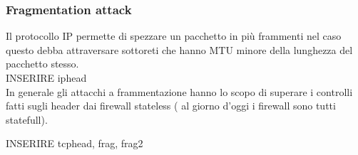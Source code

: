 \documentclass[12pt]{article}
\begin{document}
			\subsubsection{Fragmentation attack}
				Il protocollo IP permette di spezzare un pacchetto in più frammenti nel caso questo debba attraversare sottoreti che hanno MTU minore della lunghezza del pacchetto stesso. \\
				
				INSERIRE iphead\\
				
				In generale gli attacchi a frammentazione hanno lo scopo di superare i controlli fatti sugli header dai firewall stateless ( al giorno d'oggi i firewall sono tutti statefull).
				
				INSERIRE tcphead, frag, frag2\\
				
\end{document}
